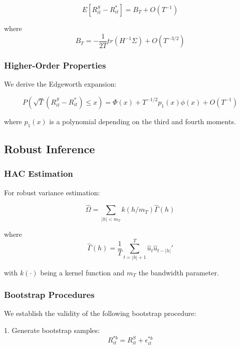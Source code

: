 \begin{equation}
    E[R_{it}^S - R_{it}^*] = B_T + O(T^{-1})
\end{equation}

where
\begin{equation}
    B_T = -\frac{1}{2T}tr(H^{-1}\Sigma) + O(T^{-3/2})
\end{equation}

\subsubsection{Higher-Order Properties}

We derive the Edgeworth expansion:

\begin{equation}
    P(\sqrt{T}(R_{it}^S - R_{it}^*) \leq x) = \Phi(x) + T^{-1/2}p_1(x)\phi(x) + O(T^{-1})
\end{equation}

where $p_1(x)$ is a polynomial depending on the third and fourth moments.

\subsection{Robust Inference}

\subsubsection{HAC Estimation}

For robust variance estimation:

\begin{equation}
    \hat{\Omega} = \sum_{|h| < m_T} k(h/m_T)\hat{\Gamma}(h)
\end{equation}

where
\begin{equation}
    \hat{\Gamma}(h) = \frac{1}{T}\sum_{t=|h|+1}^T \hat{u}_t\hat{u}_{t-|h|}'
\end{equation}

with $k(\cdot)$ being a kernel function and $m_T$ the bandwidth parameter.

\subsubsection{Bootstrap Procedures}

We establish the validity of the following bootstrap procedure:

1. Generate bootstrap samples:
\begin{equation}
    R_{it}^{*b} = R_{it}^S + \epsilon_{it}^{*b}
\end{equation}

